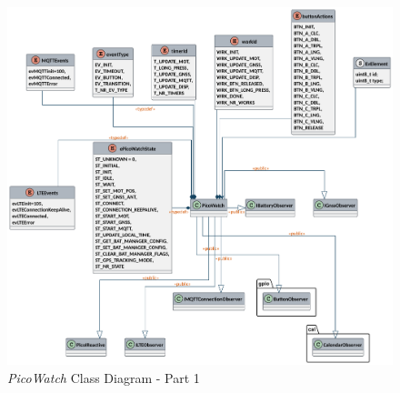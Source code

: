 \documentclass[report.tex]{subfiles}
\begin{document}
\begin{figure}[H]
	\centering
	\includegraphics[width=1\textwidth]{Include/Figure/software/class/picowatch_small_2.pdf}
	\caption{\textit{PicoWatch} Class Diagram - Part 1}
	\label{fig:picowatch_small_1}
\end{figure}
\end{document}
